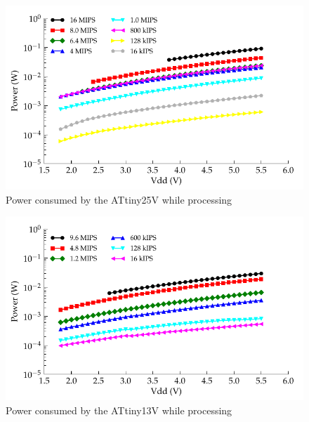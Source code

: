       \begin{figure}
      \centering
        \includegraphics{content/pt1/03-EnergyRequirements/graphics/Graph_ATtiny25V_Clock_Power}
        \caption{\label{graph:CLK_POWER_ATtiny25V}Power consumed by the ATtiny25V while processing}
      \end{figure}

      \begin{figure}
        \centering
        \includegraphics{content/pt1/03-EnergyRequirements/graphics/Graph_ATtiny13V_Clock_Power}
        \caption{\label{graph:CLK_POWER_ATtiny13V}Power consumed by the ATtiny13V while processing}
      \end{figure}

